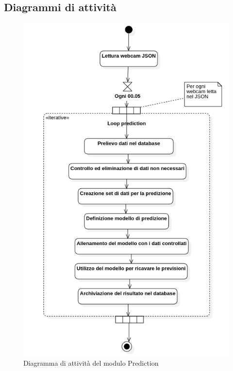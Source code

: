 \subsection{Diagrammi di attività}
\begin{center}
	\begin{figure}[H]
		\centering\includegraphics[scale=0.60]{../immagini/diag_PB/prediction_activity.png}
		\caption{Diagramma di attività del modulo Prediction}
	\end{figure}
\end{center}


